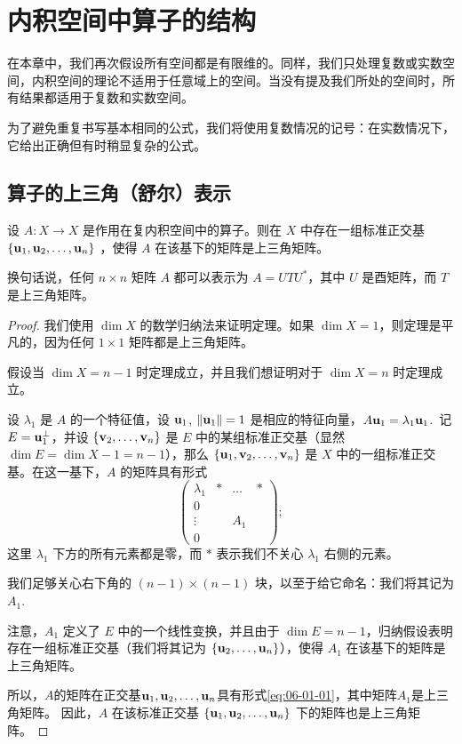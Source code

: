 

\chapter{内积空间中算子的结构}\label{chap:06}

在本章中，我们再次假设所有空间都是有限维的。同样，我们只处理复数或实数空间，内积空间的理论不适用于任意域上的空间。当没有提及我们所处的空间时，所有结果都适用于复数和实数空间。

为了避免重复书写基本相同的公式，我们将使用复数情况的记号：在实数情况下，它给出正确但有时稍显复杂的公式。

\section{算子的上三角（舒尔）表示}\label{sec:06-01}

\begin{theorem}\label{stmt:06-01-01} 设 $A: X \to X$ 是作用在复内积空间中的算子。则在 $X$ 中存在一组标准正交基 $\{\mathbf{u}_1, \mathbf{u}_2, \dots, \mathbf{u}_n\}$ ，使得 $A$ 在该基下的矩阵是上三角矩阵。

换句话说，任何 $n \times n$ 矩阵 $A$ 都可以表示为 $A = UTU^*$，其中 $U$ 是酉矩阵，而 $T$ 是上三角矩阵。\end{theorem}

\begin{proof}我们使用 $\dim X$ 的数学归纳法来证明定理。如果 $\dim X = 1$，则定理是平凡的，因为任何 $1 \times 1$ 矩阵都是上三角矩阵。

假设当 $\dim X = n-1$ 时定理成立，并且我们想证明对于 $\dim X = n$ 时定理成立。

设 $\lambda_1$ 是 $A$ 的一个特征值，设 $\mathbf{u}_1$, $\|\mathbf{u}_1\| = 1$ 是相应的特征向量，$A\mathbf{u}_1 = \lambda_1 \mathbf{u}_1$.~记 $E = \mathbf{u}_1^\perp$，并设 $\{\mathbf{v}_2, \dots, \mathbf{v}_n\}$ 是 $E$ 中的某组标准正交基（显然 $\dim E = \dim X - 1 = n-1$），那么 $\{\mathbf{u}_1, \mathbf{v}_2, \dots, \mathbf{v}_n\}$ 是 $X$ 中的一组标准正交基。在这一基下，$A$ 的矩阵具有形式\begin{equation}\label{eq:06-01-01}
\begin{pmatrix} \lambda_1 & * & \dots & * \\ 0 & & & \\ \vdots & & A_1 & \\ 0 & & & \end{pmatrix};
\end{equation}
这里 $\lambda_1$ 下方的所有元素都是零，而 $*$ 表示我们不关心 $\lambda_1$ 右侧的元素。

我们足够关心右下角的 $(n-1) \times (n-1)$ 块，以至于给它命名：我们将其记为 $A_1$.~

注意，$A_1$ 定义了 $E$ 中的一个线性变换，并且由于 $\dim E = n-1$，归纳假设表明存在一组标准正交基（我们将其记为 $\{\mathbf{u}_2, \dots, \mathbf{u}_n\}$），使得 $A_1$ 在该基下的矩阵是上三角矩阵。

所以，$A$的矩阵在正交基$\mathbf{u}_1,\mathbf{u}_2,\dots, \mathbf{u}_n$具有形式\eqref{eq:06-01-01}，其中矩阵$A_1$是上三角矩阵。
因此，$A$ 在该标准正交基 $\{\mathbf{u}_1, \mathbf{u}_2, \dots, \mathbf{u}_n\}$ 下的矩阵也是上三角矩阵。\end{proof}

